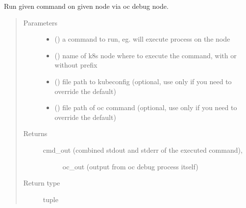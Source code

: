 \documentclass[letterpaper,10pt,english]{sphinxmanual}
\begin{document}
\begin{fulllineitems}
\label{\detokenize{ocpnetsplit:ocpnetsplit.ocp.run_oc_debug_node}}
Run given command on given node via oc debug node.
\begin{quote}\begin{description}
\item[{Parameters}] \leavevmode\begin{itemize}
\item {} 
 () \textendash{} a command to run, eg.  will
execute  process on the node

\item {} 
 () \textendash{} name of k8s node where to execute the command, with or
without  prefix

\item {} 
 () \textendash{} file path to kubeconfig (optional, use only if you
need to override the default)

\item {} 
 () \textendash{} file path of oc command (optional, use only if
you need to override the default)

\end{itemize}

\item[{Returns}] \leavevmode
\begin{description}
\item[{cmd\_out (combined stdout and stderr of the executed command),}] \leavevmode
oc\_out (output from oc debug process itself)

\end{description}


\item[{Return type}] \leavevmode
tuple

\end{description}\end{quote}

\end{fulllineitems}
\end{document}

